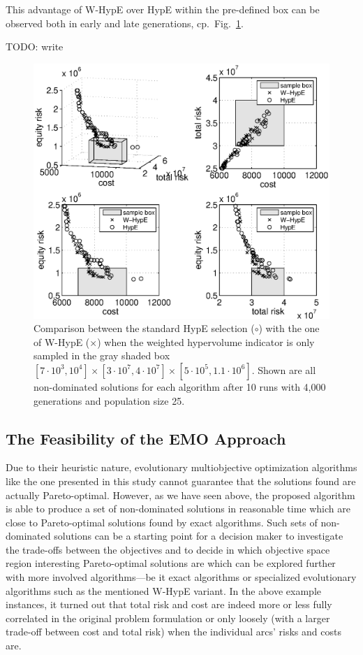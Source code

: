 \documentclass[preprint,12pt]{elsarticle}
\newcommand{\TODO}[1]{{\color{red}TODO: #1}}
\begin{document}
This advantage of W-HypE over HypE within the pre-defined box can be observed both in early and late generations, cp.\ Fig.~\ref{fig:whype}.

\TODO{write}

\begin{figure}
	\centering
	\includegraphics[width=0.75\columnwidth]{../experiments/randVsCost/WHypEVsHypE_ns4_1_OriginalCosts2.eps}
	\vspace{-1em}
	\caption{\label{fig:whype} Comparison between the standard HypE selection ($\circ$) with the one of W-HypE ($\times$) when the weighted hypervolume indicator is only sampled in the gray shaded box $[7\cdot 10^3, 10^4]\times[3\cdot 10^7, 4\cdot 10^7]\times[5\cdot 10^5, 1.1\cdot 10^6]$. Shown are all non-dominated solutions for each algorithm after 10 runs with 4,000 generations and population size 25.}
\end{figure}


\subsection{The Feasibility of the EMO Approach}
Due to their heuristic nature, evolutionary multiobjective optimization algorithms like the one presented in this study cannot guarantee that the solutions found are actually Pareto-optimal. However, as we have seen above, the proposed algorithm is able to produce a set of non-dominated solutions in reasonable time which are close to Pareto-optimal solutions found by exact algorithms. Such sets of non-dominated solutions can be a starting point for a decision maker to investigate the trade-offs between the objectives and to decide in which objective space region interesting Pareto-optimal solutions are which can be explored further with more involved algorithms---be it exact algorithms or specialized evolutionary algorithms such as the mentioned W-HypE variant. In the above example instances, it turned out that total risk and cost are indeed more or less fully correlated in the original problem formulation or only loosely (with a larger trade-off between cost and total risk) when the individual arcs' risks and costs are.
\end{document}
